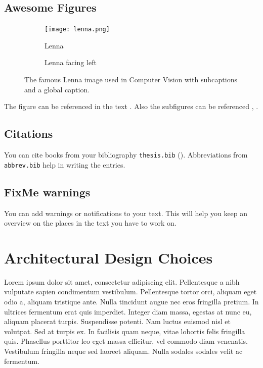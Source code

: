 \subsection[Awesome Figures in the TOC]{Awesome Figures} %
\label{sub:figures}
\begin{figure}[ht]
	\begin{center}
		\begin{subfigure}[b]{0.49\textwidth}
			\texttt{[image: lenna.png]}
			\caption{Lenna}
			\label{fig:lenna}
		\end{subfigure}
		\begin{subfigure}[b]{0.49\textwidth}
			\caption{Lenna facing left}
			\label{fig:lenna_facing_left}
		\end{subfigure}
	\end{center}
	\caption{The famous Lenna image used in Computer Vision with subcaptions and a global caption.}
	\label{fig:lennas}
\end{figure}
The figure can be referenced in the text \eg{}.
Also the subfigures can be referenced \eg{}, .

\subsection{Citations} %
\label{sub:citations}
You can cite books from your bibliography \texttt{thesis.bib} (\eg \cite{cochrane}).
Abbreviations from \texttt{abbrev.bib} help in writing the entries.

\subsection{FixMe warnings}
\label{sub:fixme}
You can add warnings or notifications to your text.
This will help you keep an overview on the places in the text you have to work on.

\section{Architectural Design Choices }
\label{sec:lorem}
Lorem ipsum dolor sit amet, consectetur adipiscing elit. Pellentesque a nibh vulputate sapien condimentum vestibulum. Pellentesque tortor orci, aliquam eget odio a, aliquam tristique ante. Nulla tincidunt augue nec eros fringilla pretium. In ultrices fermentum erat quis imperdiet. Integer diam massa, egestas at nunc eu, aliquam placerat turpis. Suspendisse potenti. Nam luctus euismod nisl et volutpat. Sed at turpis ex. In facilisis quam neque, vitae lobortis felis fringilla quis. Phasellus porttitor leo eget massa efficitur, vel commodo diam venenatis. Vestibulum fringilla neque sed laoreet aliquam. Nulla sodales sodales velit ac fermentum.

